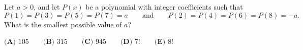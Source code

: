 Let $a>0$, and let $P(x)$ be a polynomial with integer coefficients such that
\[P(1)=P(3)=P(5)=P(7)=a\qquad\text{and}\qquad P(2)=P(4)=P(6)=P(8)=-a.\]
What is the smallest possible value of $a$?

$\textbf{(A) }105\qquad\textbf{(B) }315\qquad\textbf{(C) }945\qquad\textbf{(D) }7!\qquad\textbf{(E) }8!$

